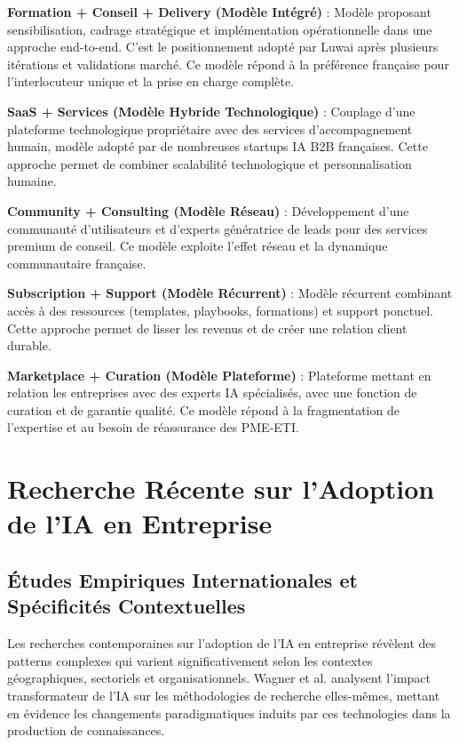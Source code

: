 \textbf{Formation + Conseil + Delivery (Modèle Intégré)} : Modèle proposant sensibilisation, cadrage stratégique et implémentation opérationnelle dans une approche end-to-end. C'est le positionnement adopté par Luwai après plusieurs itérations et validations marché. Ce modèle répond à la préférence française pour l'interlocuteur unique et la prise en charge complète.

\textbf{SaaS + Services (Modèle Hybride Technologique)} : Couplage d'une plateforme technologique propriétaire avec des services d'accompagnement humain, modèle adopté par de nombreuses startups IA B2B françaises. Cette approche permet de combiner scalabilité technologique et personnalisation humaine.

\textbf{Community + Consulting (Modèle Réseau)} : Développement d'une communauté d'utilisateurs et d'experts génératrice de leads pour des services premium de conseil. Ce modèle exploite l'effet réseau et la dynamique communautaire française.

\textbf{Subscription + Support (Modèle Récurrent)} : Modèle récurrent combinant accès à des ressources (templates, playbooks, formations) et support ponctuel. Cette approche permet de lisser les revenus et de créer une relation client durable.

\textbf{Marketplace + Curation (Modèle Plateforme)} : Plateforme mettant en relation les entreprises avec des experts IA spécialisés, avec une fonction de curation et de garantie qualité. Ce modèle répond à la fragmentation de l'expertise et au besoin de réassurance des PME-ETI.

\section{Recherche Récente sur l'Adoption de l'IA en Entreprise}

\subsection{Études Empiriques Internationales et Spécificités Contextuelles}

Les recherches contemporaines sur l'adoption de l'IA en entreprise révèlent des patterns complexes qui varient significativement selon les contextes géographiques, sectoriels et organisationnels. Wagner et al. \cite{wagner2022artificial} analysent l'impact transformateur de l'IA sur les méthodologies de recherche elles-mêmes, mettant en évidence les changements paradigmatiques induits par ces technologies dans la production de connaissances.

